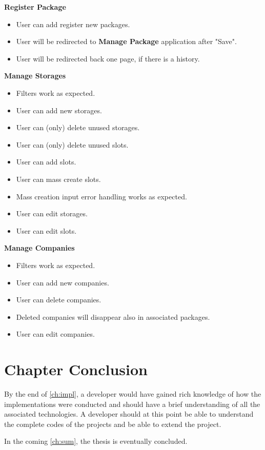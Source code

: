 \noindent
\textbf{Register Package}
\begin{itemize}
    \item User can add register new packages.
    \item User will be redirected to \textbf{Manage Package} application after "Save".
    \item User will be redirected back one page, if there is a history.
\end{itemize}

\noindent
\textbf{Manage Storages}
\begin{itemize}
    \item Filters work as expected.
    \item User can add new storages.
    \item User can (only) delete unused storages.
    \item User can (only) delete unused slots.
    \item User can add slots.
    \item User can mass create slots.
    \item Mass creation input error handling works as expected.
    \item User can edit storages.
    \item User can edit slots.
\end{itemize}

\noindent
\textbf{Manage Companies}
\begin{itemize}
    \item Filters work as expected.
    \item User can add new companies.
    \item User can delete companies.
    \item Deleted companies will disappear also in associated packages.
    \item User can edit companies.
\end{itemize}



\section*{Chapter Conclusion}

By the end of \autoref{ch:impl}, a developer would have gained rich knowledge of how the implementations were conducted and should have a brief understanding of all the associated technologies. A developer should at this point be able to understand the complete codes of the projects and be able to extend the project. 

In the coming \autoref{ch:sum}, the thesis is eventually concluded.